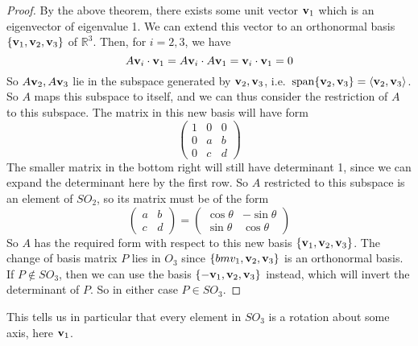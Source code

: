 \begin{proof}
	By the above theorem, there exists some unit vector \(\vb v_1\) which is an eigenvector of eigenvalue 1. We can extend this vector to an orthonormal basis \(\{ \vb v_1, \vb v_2, \vb v_3 \}\) of \(\mathbb R^3\). Then, for \(i=2,3\), we have
	\[ A\vb v_i \cdot \vb v_1 = A\vb v_i \cdot A\vb v_1 = \vb v_i \cdot \vb v_1 = 0 \]
	So \(A\vb v_2, A\vb v_3\) lie in the subspace generated by \(\vb v_2, \vb v_3\), i.e.\ \(\operatorname{span} \{ \vb v_2, \vb v_3 \} = \langle{} \vb v_2, \vb v_3 \rangle\). So \(A\) maps this subspace to itself, and we can thus consider the restriction of \(A\) to this subspace. The matrix in this new basis will have form
	\[ \begin{pmatrix}
			1 & 0 & 0 \\
			0 & a & b \\
			0 & c & d
		\end{pmatrix} \]
	The smaller matrix in the bottom right will still have determinant 1, since we can expand the determinant here by the first row. So \(A\) restricted to this subspace is an element of \(SO_2\), so its matrix must be of the form
	\[ \begin{pmatrix}
			a & b \\ c & d
		\end{pmatrix} = \begin{pmatrix}
			\cos \theta & -\sin \theta \\
			\sin \theta & \cos \theta
		\end{pmatrix} \]
	So \(A\) has the required form with respect to this new basis \(\{ \vb v_1, \vb v_2, \vb v_3 \}\). The change of basis matrix \(P\) lies in \(O_3\) since \(\{ bm v_1, \vb v_2, \vb v_3 \}\) is an orthonormal basis. If \(P \notin SO_3\), then we can use the basis \(\{ -\vb v_1, \vb v_2, \vb v_3 \}\) instead, which will invert the determinant of \(P\). So in either case \(P \in SO_3\).
\end{proof}
This tells us in particular that every element in \(SO_3\) is a rotation about some axis, here \(\vb v_1\).

